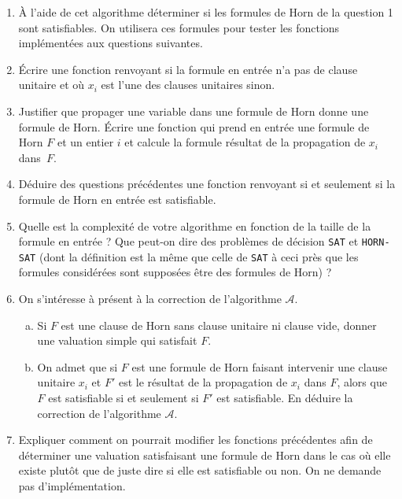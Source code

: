 \documentclass{ccinp}
\begin{document}
\begin{enumerate}[resume]
    \item \`A l'aide de cet algorithme déterminer si les formules de Horn de la question 1 sont satisfiables. On utilisera ces formules pour tester les fonctions implémentées aux questions suivantes.
    \item \'{E}crire une fonction  renvoyant  si la formule en entrée n'a pas de clause unitaire et  où $x_i$ est l'une des clauses unitaires sinon.
    \item Justifier que propager une variable dans une formule de Horn donne une formule de Horn. \'{E}crire une fonction  qui prend en entrée une formule de Horn $F$ et un entier $i$ et calcule la formule résultat de la propagation de $x_i$ dans~$F$.
    \item Déduire des questions précédentes une fonction  renvoyant  si et seulement si la formule de Horn en entrée est satisfiable.
    \item Quelle est la complexité de votre algorithme en fonction de la taille de la formule en entrée ? Que peut-on dire des problèmes de décision \texttt{SAT} et \texttt{HORN-SAT} (dont la définition est la même que celle de \texttt{SAT} à ceci près que les formules considérées sont supposées être des formules de Horn) ?
    \item On s'intéresse à présent à la correction de l'algorithme $\mathcal{A}$. \begin{enumerate}[a)]
    \item Si $F$ est une clause de Horn sans clause unitaire ni clause vide, donner une valuation simple qui satisfait $F$.
        \item On admet que si $F$ est une formule de Horn faisant intervenir une clause unitaire $x_i$ et $F'$ est le résultat de la propagation de $x_i$ dans $F$, alors que $F$ est satisfiable si et seulement si $F'$ est satisfiable. En déduire la correction de l'algorithme $\mathcal{A}$.
    \end{enumerate}
    \item Expliquer comment on pourrait modifier les fonctions précédentes afin de déterminer une valuation satisfaisant une formule de Horn dans le cas où elle existe plutôt que de juste dire si elle est satisfiable ou non. On ne demande pas d'implémentation.
\end{enumerate}
\end{document}
